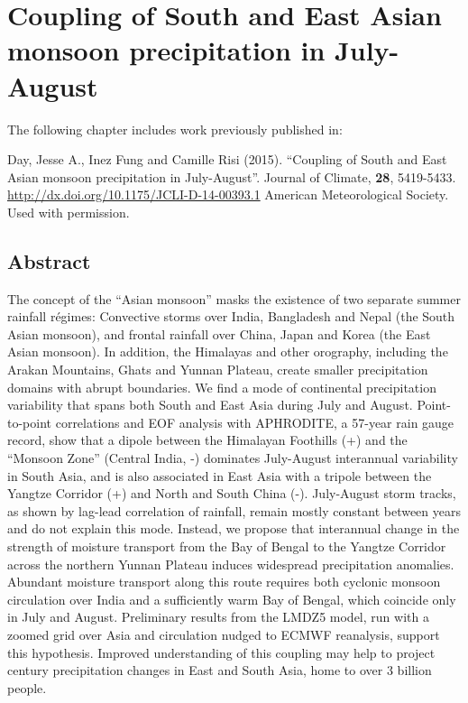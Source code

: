 \chapter{Coupling of South and East Asian monsoon precipitation in July-August}

\begin{flushleft}
The following chapter includes work previously published in:
\linebreak
\begin{addmargin}[3em]{1em}
	Day, Jesse A., Inez Fung and Camille Risi (2015). ``Coupling of South and East Asian monsoon precipitation in July-August''. Journal of Climate, \textbf{28}, 5419-5433. 
\linebreak\url{http://dx.doi.org/10.1175/JCLI-D-14-00393.1}
\linebreak\textcopyright  American Meteorological Society. Used with permission.
\end{addmargin}
\end{flushleft}

\section{Abstract}

	The concept of the ``Asian monsoon'' masks the existence of two separate summer rainfall r\'egimes: Convective storms over India, Bangladesh and Nepal (the South Asian monsoon), and frontal rainfall over China, Japan and Korea (the East Asian monsoon). In addition, the Himalayas and other orography, including the Arakan Mountains, Ghats and Yunnan Plateau, create smaller precipitation domains with abrupt boundaries. We find a mode of continental precipitation variability that spans both South and East Asia during July and August. Point-to-point correlations and EOF analysis with APHRODITE, a 57-year rain gauge record, show that a dipole between the Himalayan Foothills (+) and the ``Monsoon Zone'' (Central India, -) dominates July-August interannual variability in South Asia, and is also associated in East Asia with a tripole between the Yangtze Corridor (+) and North and South China (-). July-August storm tracks, as shown by lag-lead correlation of rainfall, remain mostly constant between years and do not explain this mode. Instead, we propose that interannual change in the strength of moisture transport from the Bay of Bengal to the Yangtze Corridor across the northern Yunnan Plateau induces widespread precipitation anomalies. Abundant moisture transport along this route requires both cyclonic monsoon circulation over India and a sufficiently warm Bay of Bengal, which coincide only in July and August. Preliminary results from the LMDZ5 model, run with a zoomed grid over Asia and circulation nudged to ECMWF reanalysis, support this hypothesis. Improved understanding of this coupling may help to project  century precipitation changes in East and South Asia, home to over 3 billion people.

